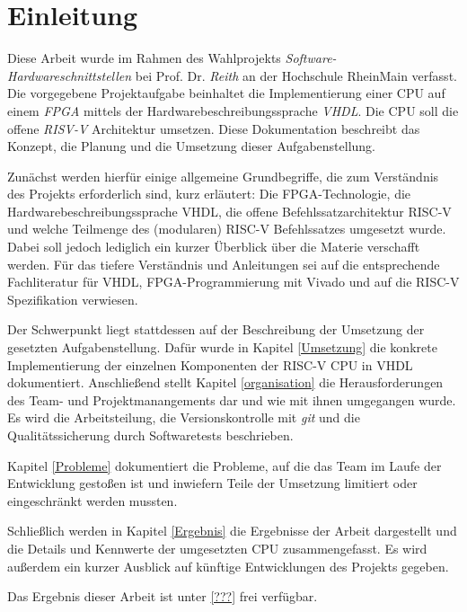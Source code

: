 \chapter{Einleitung} %
\label{Einleitung} %


\newcommand{\keyword}[1]{\textbf{#1}}
\newcommand{\tabhead}[1]{\textbf{#1}}
\newcommand{\code}[1]{\texttt{#1}}
\newcommand{\file}[1]{\texttt{\bfseries#1}}
\newcommand{\option}[1]{\itshape#1}

Diese Arbeit wurde im Rahmen des Wahlprojekts \textit{Software- Hardwareschnittstellen} bei Prof. Dr. \emph{Reith} an der Hochschule RheinMain verfasst. Die vorgegebene Projektaufgabe beinhaltet die Implementierung einer CPU auf einem \emph{FPGA} mittels der Hardwarebeschreibungssprache \emph{VHDL}. Die CPU soll die offene \emph{RISV-V} Architektur umsetzen. Diese Dokumentation beschreibt das Konzept, die Planung und die Umsetzung dieser Aufgabenstellung.

Zunächst werden hierfür einige allgemeine Grundbegriffe, die zum Verständnis des Projekts erforderlich sind, kurz erläutert: Die FPGA-Technologie, die Hardwarebeschreibungssprache VHDL, die offene Befehlssatzarchitektur RISC-V und welche Teilmenge des (modularen) RISC-V Befehlssatzes umgesetzt wurde. Dabei soll jedoch lediglich ein kurzer Überblick über die Materie verschafft werden. Für das tiefere Verständnis und Anleitungen sei auf die entsprechende Fachliteratur für VHDL\citep{Ashenden:609207}, FPGA-Programmierung\cite{Chu} mit Vivado\cite{churiwala} und auf die RISC-V Spezifikation\citep{RISC} verwiesen.

Der Schwerpunkt liegt stattdessen auf der Beschreibung der Umsetzung der gesetzten Aufgabenstellung. Dafür wurde in Kapitel \ref{Umsetzung} die konkrete Implementierung der einzelnen Komponenten der RISC-V CPU in VHDL dokumentiert. Anschließend stellt Kapitel \ref{organisation} die Herausforderungen des Team- und Projektmanangements dar und wie mit ihnen umgegangen wurde. Es wird die Arbeitsteilung, die Versionskontrolle mit \emph{git} und die Qualitätssicherung durch Softwaretests beschrieben.

Kapitel \ref{Probleme} dokumentiert die Probleme, auf die das Team im Laufe der Entwicklung gestoßen ist und inwiefern Teile der Umsetzung limitiert oder eingeschränkt werden mussten. 

Schließlich werden in Kapitel \ref{Ergebnis} die Ergebnisse der Arbeit dargestellt und die Details und Kennwerte der umgesetzten CPU zusammengefasst. Es wird außerdem ein kurzer Ausblick auf künftige Entwicklungen des Projekts gegeben.

Das Ergebnis dieser Arbeit ist unter \ref{???} frei verfügbar.

